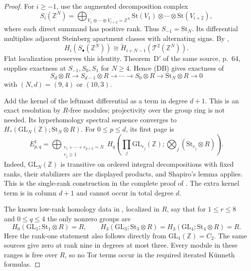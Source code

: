 \begin{proof}
For $i\ge-1$, use the augmented decomposition complex
\[
 S_i(\mathbb Z^N)=
 \bigoplus_{V_1\oplus\cdots\oplus V_{i+2}=\mathbb Z^N}
       \mathrm{St}(V_1)\otimes\cdots\otimes\mathrm{St}(V_{i+2}),
\]
where each direct summand has positive rank. Thus $S_{-1}=\mathrm{St}_N$.
Its differential multiplies adjacent Steinberg apartment classes with
alternating signs. By \cite[Theorem~23.3, p.~49]{MillerPatztPutman2025},
\[
 H_i(S_\bullet(\mathbb Z^N))
   \cong\widetilde H_{i+N-1}(\mathcal T^2(\mathbb Z^N)).
\]
Flat localization preserves this identity.
Theorem~D$'$ of the same source, p.~64, supplies exactness at
$S_{-1},S_0,S_1$ for $N\ge4$. Hence \textup{(DB)} gives exactness
of
\[
 S_d\otimes R\longrightarrow S_{d-1}\otimes R\longrightarrow\cdots
 \longrightarrow S_0\otimes R\longrightarrow\mathrm{St}_N\otimes R
 \longrightarrow0
\]
with $(N,d)=(9,4)$ or $(10,3)$.

Add the kernel of the leftmost differential as a term in degree
$d+1$. This is an exact resolution by $R$-free modules; projectivity
over the group ring is not needed. Its hyperhomology spectral sequence
converges to $H_*(\mathrm{GL}_N(\mathbb Z);\mathrm{St}_N\otimes R)$.
For $0\le p\le d$, its first page is
\[
 E^1_{p,q}=
 \bigoplus_{\substack{r_1+\cdots+r_{p+2}=N\\r_j\ge1}}
 H_q\left(\prod_j\mathrm{GL}_{r_j}(\mathbb Z);
                   \bigotimes_j(\mathrm{St}_{r_j}\otimes R)\right).
                                                               \tag{DB1}
\]
Indeed, $\mathrm{GL}_N(\mathbb Z)$ is transitive on ordered integral
decompositions with fixed ranks, their stabilizers are the displayed
products, and Shapiro's lemma applies. This is the single-rank
construction in the complete proof of
\cite[Lemma~23.5, pp.~50--51]{MillerPatztPutman2025}.
The extra kernel term is in column $d+1$ and cannot occur in total
degree $d$.

The known low-rank homology data in \cite[Table~5, p.~17;
Theorem~4.5 and Proposition~1.5]{DEKM2026}, localized in $R$, say
that for $1\le r\le8$ and $0\le q\le4$ the only nonzero groups
are
\[
 H_0(\mathrm{GL}_1;\mathrm{St}_1\otimes R)=R,
 \qquad
 H_3(\mathrm{GL}_3;\mathrm{St}_3\otimes R)=
 H_3(\mathrm{GL}_4;\mathrm{St}_4\otimes R)=R.
\]
Here the rank-one statement also follows directly from
$\mathrm{GL}_1(\mathbb Z)=C_2$. The same sources give zero at
rank nine in degrees at most three. Every module in these ranges
is free over $R$, so no Tor terms occur in the required iterated
K\"unneth formulas.


\end{proof}
